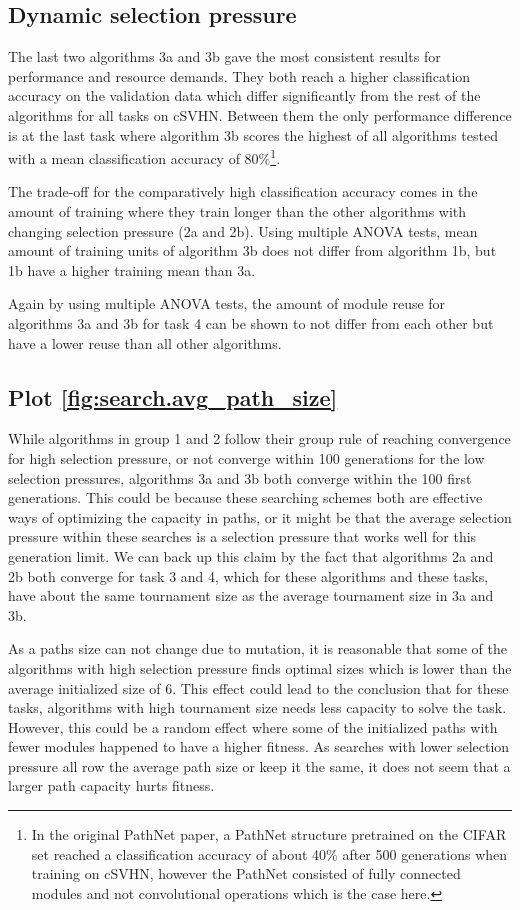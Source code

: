 \subsection{Dynamic selection pressure}
The last two algorithms 3a and 3b gave the most consistent results for performance and resource demands. They both reach a higher classification accuracy on the validation data which differ significantly from the rest of the algorithms for all tasks on cSVHN. Between them the only performance difference is at the last task where algorithm 3b scores the highest of all algorithms tested with a mean classification accuracy of 80\%\footnote{In the original PathNet paper, a PathNet structure pretrained on the CIFAR set reached a classification accuracy of about 40\% after 500 generations when training on cSVHN, however the PathNet consisted of fully connected modules and not convolutional operations which is the case here.}.

The trade-off for the comparatively high classification accuracy comes in the amount of training where they train longer than the other algorithms with changing selection pressure (2a and 2b). Using multiple ANOVA tests, mean amount of training units of algorithm 3b does not differ from algorithm 1b, but 1b have a higher training mean than 3a.

Again by using multiple ANOVA tests, the amount of module reuse for algorithms 3a and 3b for task 4 can be shown to not differ from each other but have a lower reuse than all other algorithms. 

\subsection{Plot \ref{fig:search.avg_path_size}}
While algorithms in group 1 and 2 follow their group rule of reaching convergence for high selection pressure, or not converge within 100 generations for the low selection pressures, algorithms 3a and 3b both converge within the 100 first generations. This could be because these searching schemes both are effective ways of optimizing the capacity in paths, or it might be that the average selection pressure within these searches is a selection pressure that works well for this generation limit. We can back up this claim by the fact that algorithms 2a and 2b both converge for task 3 and 4, which for these algorithms and these tasks, have about the same tournament size as the average tournament size in 3a and 3b. 

As a paths size can not change due to mutation, it is reasonable that some of the algorithms with high selection pressure finds optimal sizes which is lower than the average initialized size of 6. This effect could lead to the conclusion that for these tasks, algorithms with high tournament size needs less capacity to solve the task. However, this could be a random effect where some of the initialized paths with fewer modules happened to have a higher fitness. As searches with lower selection pressure all row the average path size or keep it the same, it does not seem that a larger path capacity hurts fitness.
